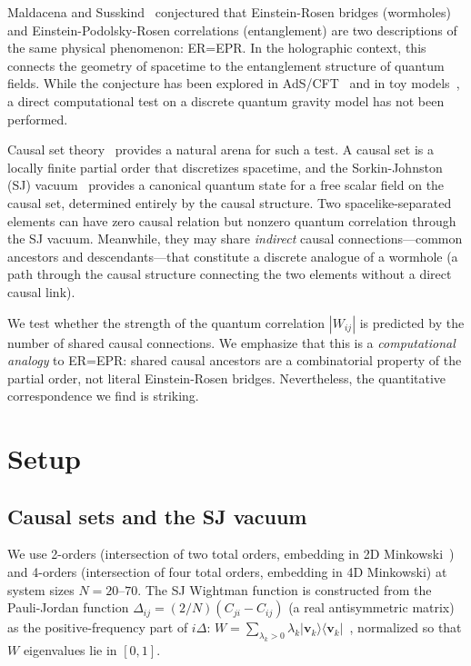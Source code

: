 \documentclass[aps,prd,twocolumn,superscriptaddress,nofootinbib]{revtex4-2}
\begin{document}
Maldacena and Susskind~\cite{maldacena2013} conjectured that Einstein-Rosen bridges (wormholes) and Einstein-Podolsky-Rosen correlations (entanglement) are two descriptions of the same physical phenomenon: ER=EPR. In the holographic context, this connects the geometry of spacetime to the entanglement structure of quantum fields. While the conjecture has been explored in AdS/CFT~\cite{vanraamsdonk2010} and in toy models~\cite{fields2024}, a direct computational test on a discrete quantum gravity model has not been performed.

Causal set theory~\cite{bombelli1987,surya2019} provides a natural arena for such a test. A causal set is a locally finite partial order that discretizes spacetime, and the Sorkin-Johnston (SJ) vacuum~\cite{johnston2009,sorkin2012} provides a canonical quantum state for a free scalar field on the causal set, determined entirely by the causal structure. Two spacelike-separated elements can have zero causal relation but nonzero quantum correlation through the SJ vacuum. Meanwhile, they may share \emph{indirect} causal connections---common ancestors and descendants---that constitute a discrete analogue of a wormhole (a path through the causal structure connecting the two elements without a direct causal link).

We test whether the strength of the quantum correlation $|W_{ij}|$ is predicted by the number of shared causal connections. We emphasize that this is a \emph{computational analogy} to ER=EPR: shared causal ancestors are a combinatorial property of the partial order, not literal Einstein-Rosen bridges. Nevertheless, the quantitative correspondence we find is striking.

\section{Setup}

\subsection{Causal sets and the SJ vacuum}

We use 2-orders (intersection of two total orders, embedding in 2D Minkowski~\cite{glaser2018}) and 4-orders (intersection of four total orders, embedding in 4D Minkowski) at system sizes $N = 20$--$70$. The SJ Wightman function is constructed from the Pauli-Jordan function $\Delta_{ij} = (2/N)(C_{ji} - C_{ij})$ (a real antisymmetric matrix) as the positive-frequency part of $i\Delta$: $W = \sum_{\lambda_k > 0} \lambda_k |\mathbf{v}_k\rangle\langle\mathbf{v}_k|$~\cite{johnston2009,sorkin2012}, normalized so that $W$ eigenvalues lie in $[0,1]$.
\end{document}
